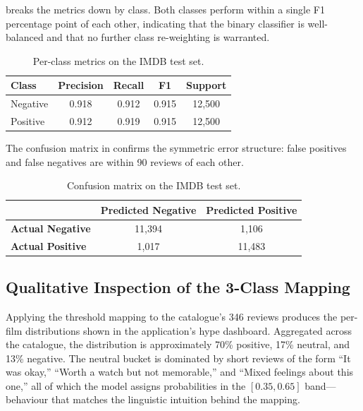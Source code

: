 \documentclass[11pt, a4paper]{article}
\begin{document}
 breaks the metrics down by class. Both classes perform within a single F1 percentage point of each other, indicating that the binary classifier is well-balanced and that no further class re-weighting is warranted.

\begin{table}[ht]
\centering
\small
\begin{tabular}{l c c c c}
\toprule
\textbf{Class} & \textbf{Precision} & \textbf{Recall} & \textbf{F1} & \textbf{Support} \\
\midrule
Negative & 0.918 & 0.912 & 0.915 & 12{,}500 \\
Positive & 0.912 & 0.919 & 0.915 & 12{,}500 \\
\bottomrule
\end{tabular}
\caption{Per-class metrics on the IMDB test set.}
\label{tab:perclass}
\end{table}

The confusion matrix in  confirms the symmetric error structure: false positives and false negatives are within 90 reviews of each other.

\begin{table}[ht]
\centering
\small
\begin{tabular}{l c c}
\toprule
& \textbf{Predicted Negative} & \textbf{Predicted Positive} \\
\midrule
\textbf{Actual Negative} & 11{,}394 & 1{,}106 \\
\textbf{Actual Positive} & 1{,}017  & 11{,}483 \\
\bottomrule
\end{tabular}
\caption{Confusion matrix on the IMDB test set.}
\label{tab:confusion}
\end{table}

\subsection{Qualitative Inspection of the 3-Class Mapping}

Applying the threshold mapping to the catalogue's 346 reviews produces the per-film distributions shown in the application's hype dashboard. Aggregated across the catalogue, the distribution is approximately 70\% positive, 17\% neutral, and 13\% negative. The neutral bucket is dominated by short reviews of the form ``It was okay,'' ``Worth a watch but not memorable,'' and ``Mixed feelings about this one,'' all of which the model assigns probabilities in the $[0.35, 0.65]$ band---behaviour that matches the linguistic intuition behind the mapping.
\end{document}
